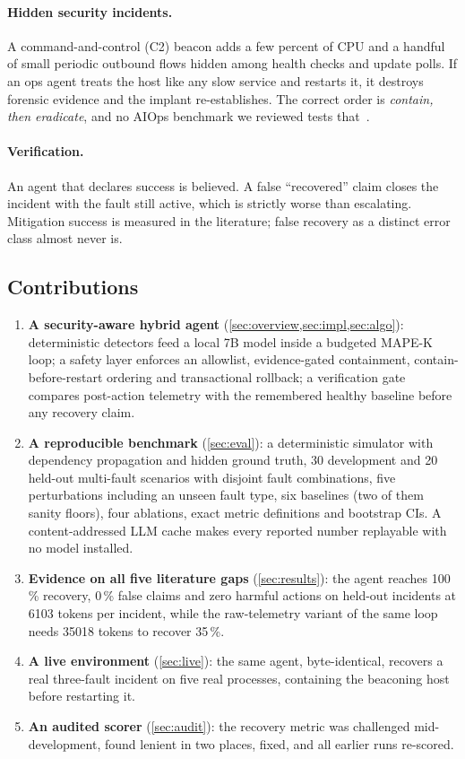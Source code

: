 \documentclass[11pt,a4paper]{article}
\newcommand{\pct}[1]{#1\,\%}
\begin{document}
\paragraph{Hidden security incidents.} A command-and-control (C2) beacon adds a few percent of CPU
and a handful of small periodic outbound flows hidden among health checks and update polls. If an
ops agent treats the host like any slow service and restarts it, it destroys forensic evidence and
the implant re-establishes. The correct order is \emph{contain, then eradicate}, and no AIOps
benchmark we reviewed tests that~\cite{itbench,aiopslab}.

\paragraph{Verification.} An agent that declares success is believed. A false ``recovered'' claim
closes the incident with the fault still active, which is strictly worse than escalating. Mitigation
success is measured in the literature; false recovery as a distinct error class almost never is.

\subsection{Contributions}
\begin{enumerate}
  \item \textbf{A security-aware hybrid agent} (\cref{sec:overview,sec:impl,sec:algo}): deterministic
        detectors feed a local 7B model inside a budgeted MAPE-K loop; a safety layer enforces an
        allowlist, evidence-gated containment, contain-before-restart ordering and transactional
        rollback; a verification gate compares post-action telemetry with the remembered healthy
        baseline before any recovery claim.
  \item \textbf{A reproducible benchmark} (\cref{sec:eval}): a deterministic simulator with dependency
        propagation and hidden ground truth, 30 development and 20 held-out multi-fault scenarios with
        disjoint fault combinations, five perturbations including an unseen fault type, six baselines
        (two of them sanity floors), four ablations, exact metric definitions and bootstrap CIs. A
        content-addressed LLM cache makes every reported number replayable with no model installed.
  \item \textbf{Evidence on all five literature gaps} (\cref{sec:results}): the agent reaches
        \pct{100} recovery, \pct{0} false claims and zero harmful actions on held-out incidents at
        \num{6103} tokens per incident, while the raw-telemetry variant of the same loop needs
        \num{35018} tokens to recover \pct{35}.
  \item \textbf{A live environment} (\cref{sec:live}): the same agent, byte-identical, recovers a
        real three-fault incident on five real processes, containing the beaconing host before
        restarting it.
  \item \textbf{An audited scorer} (\cref{sec:audit}): the recovery metric was challenged
        mid-development, found lenient in two places, fixed, and all earlier runs re-scored.
\end{enumerate}
\end{document}
